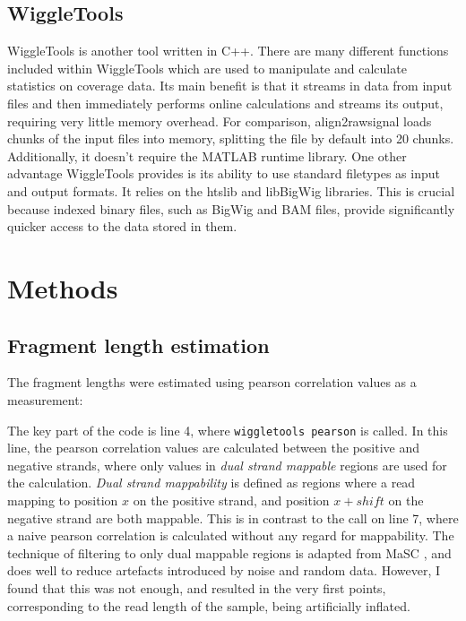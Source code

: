 \documentclass[a4paper]{article}
\begin{document}
    \subsection{WiggleTools}
    WiggleTools is another tool written in C++. There are many different functions included within WiggleTools which are
    used to manipulate and calculate statistics on coverage data. Its main benefit is that it streams in data from input files and then
    immediately performs online calculations and streams its output, requiring very little memory overhead. For comparison,
    align2rawsignal loads chunks of the input files into memory, splitting the file by default into 20 chunks. Additionally,
    it doesn't require the MATLAB runtime library.
    One other advantage WiggleTools provides is its ability to use standard filetypes as input and output formats. It relies on the
    htslib and libBigWig libraries. This is crucial because indexed binary files, such as BigWig and BAM files, provide
    significantly quicker access to the data stored in them.

  \section{Methods}

    \subsection{Fragment length estimation}
    The fragment lengths were estimated using pearson correlation values as a measurement:
    
    The key part of the code is line 4, where \verb$wiggletools pearson$ is called. In this line, the pearson correlation
    values are calculated between the positive and negative strands, where only values in \textit{dual strand mappable}
    regions are used for the calculation. \textit{Dual strand mappability} is defined as regions where a read mapping to
    position $x$ on the positive strand, and position $x + shift$ on the negative strand are both mappable. This is in contrast
    to the call on line 7, where a naive pearson correlation is calculated without any regard for mappability. The technique
    of filtering to only dual mappable regions is adapted from MaSC \cite{ramachandran_masc:_2013}, and does well to reduce artefacts introduced
    by noise and random data. However, I found that this was not enough, and resulted in the very first points, corresponding
    to the read length of the sample, being artificially inflated.
\end{document}
